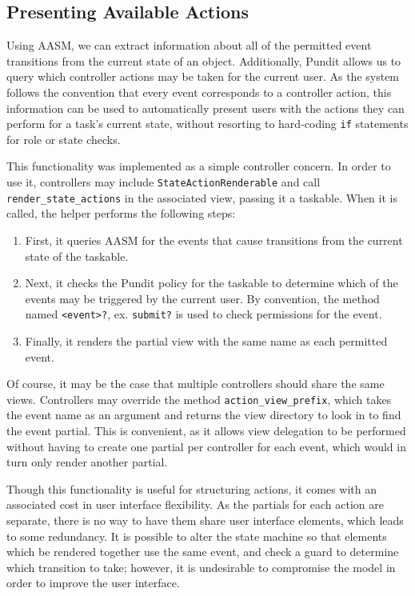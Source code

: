 \documentclass[document.tex]{subfiles}
\begin{document}
\FloatBarrier

\subsection {Presenting Available Actions}

Using AASM, we can extract information about all of the permitted event transitions from the current state of an object. Additionally, Pundit allows us to query which controller actions may be taken for the current user. As the system follows the convention that every event corresponds to a controller action, this information can be used to automatically present users with the actions they can perform for a task's current state, without resorting to hard-coding \verb!if! statements for role or state checks.

This functionality was implemented as a simple controller concern. In order to use it, controllers may include \verb!StateActionRenderable! and call 
\verb!render_state_actions! in the associated view, passing it a taskable. When it is called, the helper performs the following steps:
\begin{enumerate}
\item First, it queries AASM for the events that cause transitions from the current state of the taskable.
\item Next, it checks the Pundit policy for the taskable to determine which of the events may be triggered by the current user. By convention, the method named \verb!<event>?!, ex. \verb!submit?! is used to check permissions for the event.
\item Finally, it renders the partial view with the same name as each permitted event.
\end{enumerate}

Of course, it may be the case that multiple controllers should share the same views. Controllers may override the method \verb!action_view_prefix!, which takes the event name as an argument and returns the view directory to look in to find the event partial. This is convenient, as it allows view delegation to be performed without having to create one partial per controller for each event, which would in turn only render another partial.

Though this functionality is useful for structuring actions, it comes with an associated cost in user interface flexibility. As the partials for each action are separate, there is no way to have them share user interface elements, which leads to some redundancy. It is possible to alter the state machine so that elements which be rendered together use the same event, and check a guard to determine which transition to take; however, it is undesirable to compromise the model in order to improve the user interface. 
\end{document}
